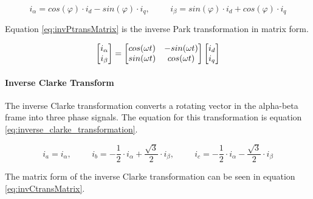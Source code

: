 \begin{equation}
    i_{\alpha} = cos(\varphi) \cdot i_{d} - sin(\varphi) \cdot i_{q}
    , \hspace{1cm}
    i_{\beta} = sin(\varphi) \cdot i_{d} + cos(\varphi) \cdot i_{q}
    \label{eq:inverse_park_transformation}
\end{equation}

Equation \ref{eq:invPtransMatrix} is the inverse Park transformation in matrix form.

\begin{equation}
    \centering
    \begin{bmatrix}
        i_{\alpha} \\ 
        i_{\beta}
    \end{bmatrix}
    =
    \begin{bmatrix}
       cos(\omega t) & -sin(\omega t) \\
       sin(\omega t) & cos(\omega t)
    \end{bmatrix}
    \begin{bmatrix}
        i_{d} \\ 
        i_{q}
    \end{bmatrix}
    \label{eq:invPtransMatrix}
\end{equation}
\paragraph{Inverse Clarke Transform}
The inverse Clarke transformation converts a rotating vector in the alpha-beta frame into three phase signals. The equation for this transformation is equation \ref{eq:inverse_clarke_transformation}.

\begin{equation}
    i_{a} = i_{\alpha}
    , \hspace{1cm}
    i_{b} = -\frac{1}{2} \cdot i_{\alpha} + \frac{\sqrt{3}}{2} \cdot i_{\beta}
    , \hspace{1cm}
    i_{c} = -\frac{1}{2} \cdot i_{\alpha} - \frac{\sqrt{3}}{2} \cdot i_{\beta}
    \label{eq:inverse_clarke_transformation}
\end{equation}

The matrix form of the inverse Clarke transformation can be seen in equation \ref{eq:invCtransMatrix}.

